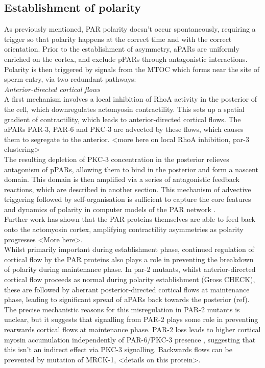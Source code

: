 \documentclass[12pt]{"report"}
\begin{document}
\subsection{Establishment of polarity}

As previously mentioned, PAR polarity doesn't occur spontaneously, requiring a trigger so that polarity happens at the correct time and with the correct orientation. Prior to the establishment of asymmetry, aPARs are uniformly enriched on the cortex, and exclude pPARs through antagonistic interactions. Polarity is then triggered by signals from the MTOC which forms near the site of sperm entry, via two redundant pathways:\\

\textit{Anterior-directed cortical flows}\\

A first mechanism involves a local inhibition of RhoA activity in the posterior of the cell, which downregulates actomyosin contractility. This sets up a spatial gradient of contractility, which leads to anterior-directed cortical flows. The aPARs PAR-3, PAR-6 and PKC-3 are advected by these flows, which causes them to segregate to the anterior. <more here on local RhoA inhibition, par-3 clustering>\\

The resulting depletion of PKC-3 concentration in the posterior relieves antagonism of pPARs, allowing them to bind in the posterior and form a nascent domain. This domain is then amplified via a series of antagonistic feedback reactions, which are described in another section. This mechanism of advective triggering followed by self-organisation is sufficient to capture the core features and dynamics of polarity in computer models of the PAR network \citep{Goehring2011a}.\\

Further work has shown that the PAR proteins themselves are able to feed back onto the actomyosin cortex, amplifying contractility asymmetries as polarity progresses \citep{Gross2018} <More here>.\\

Whilst primarily important during establishment phase, continued regulation of cortical flow by the PAR proteins also plays a role in preventing the breakdown of polarity during maintenance phase. In par-2 mutants, whilst anterior-directed cortical flow proceeds as normal during polarity establishment (Gross CHECK), these are followed by aberrant posterior-directed cortical flows at maintenance phase, leading to significant spread of aPARs back towards the posterior (ref). The precise mechanistic reasons for this misregulation in PAR-2 mutants is unclear, but it suggests that signalling from PAR-2 plays some role in preventing rearwards cortical flows at maintenance phase.  PAR-2 loss leads to higher cortical myosin accumulation independently of PAR-6/PKC-3 presence \citep{Munro2004, Beatty2013}, suggesting that this isn't an indirect effect via PKC-3 signalling. Backwards flows can be prevented by mutation of MRCK-1, <details on this protein>.\\
\end{document}
